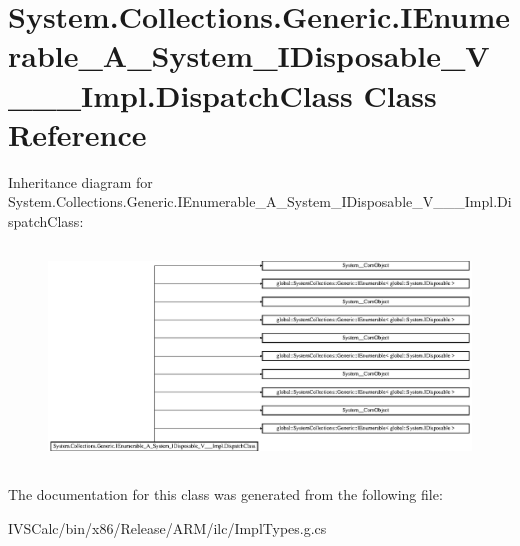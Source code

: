 \hypertarget{class_system_1_1_collections_1_1_generic_1_1_i_enumerable___a___system___i_disposable___v_______impl_1_1_dispatch_class}{}\section{System.\+Collections.\+Generic.\+I\+Enumerable\+\_\+\+A\+\_\+\+System\+\_\+\+I\+Disposable\+\_\+\+V\+\_\+\+\_\+\+\_\+\+Impl.\+Dispatch\+Class Class Reference}
\label{class_system_1_1_collections_1_1_generic_1_1_i_enumerable___a___system___i_disposable___v_______impl_1_1_dispatch_class}
Inheritance diagram for System.\+Collections.\+Generic.\+I\+Enumerable\+\_\+\+A\+\_\+\+System\+\_\+\+I\+Disposable\+\_\+\+V\+\_\+\+\_\+\+\_\+\+Impl.\+Dispatch\+Class\+:\begin{figure}[H]
\begin{center}
\leavevmode
\includegraphics[height=5.844402cm]{class_system_1_1_collections_1_1_generic_1_1_i_enumerable___a___system___i_disposable___v_______impl_1_1_dispatch_class}
\end{center}
\end{figure}


The documentation for this class was generated from the following file\+:\begin{DoxyCompactItemize}
\item 
I\+V\+S\+Calc/bin/x86/\+Release/\+A\+R\+M/ilc/Impl\+Types.\+g.\+cs\end{DoxyCompactItemize}
